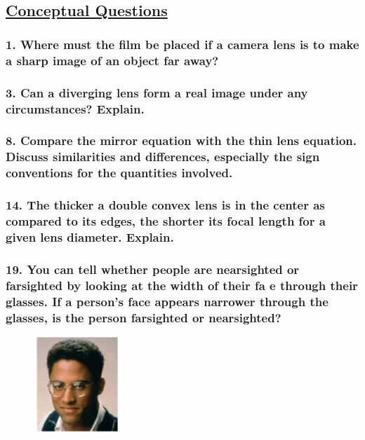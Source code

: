 \documentclass{article}
\title{
    \vspace{2in}
    \textmd{\textbf{\hmwkTitle}}\\
    \vspace{0.5in}
    \textmd{\textbf{\hmwkClass}}\\
    \vspace{4in}
}
\author{\hmwkAuthorName}
\date{}
\begin{document}
\maketitle
\newpage
\begin{center}
    \section*{\textbf{\underline {Conceptual Questions}}}
\end{center}
\subsubsection*{
    1. Where must the film be placed if a camera lens is to make a sharp image
    of an object far away?
}
\subsubsection*{
    3.  Can a diverging lens form a real image under any circumstances? Explain. 
}
\subsubsection*{
    8. Compare the mirror equation with the thin lens equation. Discuss similarities
    and differences, especially the sign conventions for the quantities involved.
}
\subsubsection*{
    14. The thicker a double convex lens is in the center as compared to its edges,
    the shorter its focal length for a given lens diameter. Explain.
}
\subsubsection*{
    19. You can tell whether people are nearsighted or farsighted by looking at the
    width of their fa e through their glasses. If a person’s face appears narrower
    through the glasses, is the person farsighted or nearsighted? 
}
\begin{figure}[h]
    \begin{center}
        \includegraphics[width=0.3\textwidth]{figures/q19.jpg}
    \end{center}
\end{figure}
\end{document}
